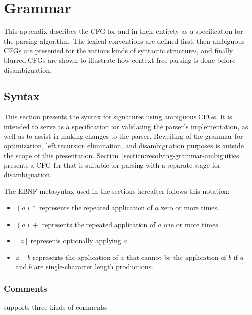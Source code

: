 \chapter{\Beluga Grammar}\label{chapter:grammar}

This appendix describes the \ac{CFG} for \Beluga and \Harpoon in their entirety as a specification for the parsing algorithm.
The lexical conventions are defined first, then ambiguous \acp{CFG} are presented for the various kinds of syntactic structures, and finally blurred \acp{CFG} are shown to illustrate how context-free parsing is done before disambiguation.

\section{Syntax}\label{section:syntax}

This section presents the syntax for \Beluga signatures using ambiguous \acp{CFG}.
It is intended to serve as a specification for validating the parser's implementation, as well as to assist in making changes to the parser.
Rewriting of the grammar for optimization, left recursion elimination, and disambiguation purposes is outside the scope of this presentation.
Section~\ref{section:resolving-grammar-ambiguities} presents a \ac{CFG} for \Beluga that is suitable for parsing with a separate stage for disambiguation.

The \ac{EBNF} metasyntax used in the sections hereafter follows this notation:

\begin{itemize}
\item $ (a)* $ represents the repeated application of $ a $ zero or more times.
\item $ (a)+ $ represents the repeated application of $ a $ one or more times.
\item $ [a] $ represents optionally applying $ a $.
\item $ a - b $ represents the application of $ a $ that cannot be the application of $ b $ if $ a $ and $ b $ are single-character length productions.
\end{itemize}

\subsection{Comments}\label{section:comments-lexical-convention}

\Beluga supports three kinds of comments:

